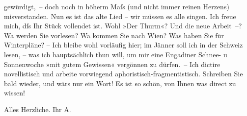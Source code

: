                gewürdigt, – doch noch in höherm Maſs (und nicht immer reinen Herzens) misverstanden.
               Nun es ist das alte Lied – wir müssen es alle singen. Ich freue mich, dſs Ihr Stück
               vollendet ist. Wohl »Der Thurm«? Und die neue
               Arbeit –? Wa{\geminationn} werden Sie vorlesen? Wa{\geminationn} kommen Sie nach Wien? Was haben Sie für Winterpläne? – Ich bleibe wohl vorläufig hier; im
                  Jänner{ }soll {\pb}ich in der Schweiz lesen, – was ich hauptsächlich thun
               will, um mir eine Engadiner Schnee- u
               Sonnenwoche \strikeout{\textcolor{gray}{ver}} »mit gutem Gewissen« vergönnen zu dürfen. – Ich dictire novellistisch und
               arbeite vorwiegend aphoristisch-fragmentistisch. Schreiben Sie bald wieder, und wärs
               nur ein Wort! Es ist so schön, von Ihnen was direct zu wissen! \pend
           
\pstart
           Alles Herzliche. Ihr \spacefill\mbox{A.}\pend
           \endnumbering{}  
      